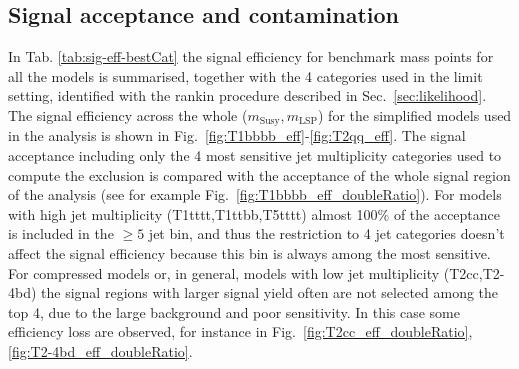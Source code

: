 \subsection{Signal acceptance and contamination}
\label{sec:sig-accept-contam}
In Tab. \ref{tab:sig-eff-bestCat} the signal efficiency for benchmark mass points for all the models is summarised, 
together with the 4 categories used in the limit setting, identified with the rankin procedure described in Sec.~\ref{sec:likelihood}. \\
The signal efficiency across the whole ($m_{\mathrm{Susy}},m_{\mathrm{LSP}}$) for the simplified models used in the analysis 
is shown in Fig.~\ref{fig:T1bbbb_eff}-\ref{fig:T2qq_eff}. 
The signal acceptance including only the 4 most sensitive jet multiplicity categories used to compute the exclusion 
is compared with the acceptance of the whole signal region of the analysis (see for example Fig.~\ref{fig:T1bbbb_eff_doubleRatio}). 
For models with high jet multiplicity (T1tttt,T1ttbb,T5tttt) almost 100\% of the acceptance is 
included in the $\geq5$ jet bin, and thus the restriction to 4 jet categories doesn't affect the signal efficiency 
because this bin is always among the most sensitive.  
For compressed models or, in general, models with low jet multiplicity (T2cc,T2-4bd) the signal regions with larger signal yield often are not 
selected among the top 4, due to the large background and poor sensitivity. 
In this case some efficiency loss are observed, for instance in Fig.~\ref{fig:T2cc_eff_doubleRatio},\ref{fig:T2-4bd_eff_doubleRatio}. 


